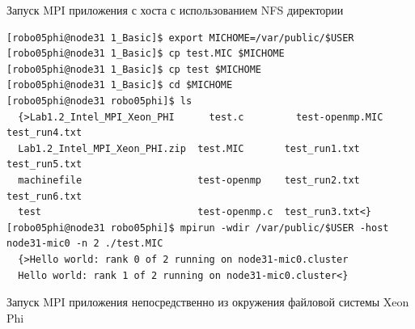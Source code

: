 \documentclass[pscyr,10pt]{hedlab}
\begin{document}
  \begin{center}
    Запуск MPI приложения с хоста с использованием NFS директории
  \end{center}

\begin{lstlisting}
[robo05phi@node31 1_Basic]$ export MICHOME=/var/public/$USER
[robo05phi@node31 1_Basic]$ cp test.MIC $MICHOME
[robo05phi@node31 1_Basic]$ cp test $MICHOME
[robo05phi@node31 1_Basic]$ cd $MICHOME
[robo05phi@node31 robo05phi]$ ls
  {>Lab1.2_Intel_MPI_Xeon_PHI      test.c         test-openmp.MIC  test_run4.txt
  Lab1.2_Intel_MPI_Xeon_PHI.zip  test.MIC       test_run1.txt    test_run5.txt
  machinefile                    test-openmp    test_run2.txt    test_run6.txt
  test                           test-openmp.c  test_run3.txt<}
[robo05phi@node31 robo05phi]$ mpirun -wdir /var/public/$USER -host node31-mic0 -n 2 ./test.MIC
  {>Hello world: rank 0 of 2 running on node31-mic0.cluster
  Hello world: rank 1 of 2 running on node31-mic0.cluster<}
\end{lstlisting}

  \begin{center}
    Запуск MPI приложения непосредственно из окружения файловой системы
      Xeon Phi
  \end{center}
\end{document}
